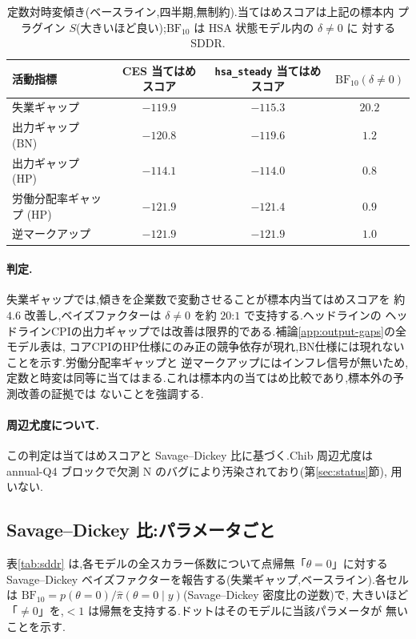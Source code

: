 \documentclass[11pt]{article}
\newcommand{\code}[1]{\texttt{#1}}
\begin{document}
\begin{table}[H]
\centering
\caption{定数対時変傾き(ベースライン,四半期,無制約).当てはめスコアは上記の標本内
プラグイン $S$(大きいほど良い);$\mathrm{BF}_{10}$ は HSA 状態モデル内の $\delta\neq0$ に
対する SDDR.}
\label{tab:mc}
\begin{tabular}{lccc}
\toprule
活動指標 & CES 当てはめスコア & \code{hsa\_steady} 当てはめスコア & $\mathrm{BF}_{10}(\delta\neq0)$ \\
\midrule
失業ギャップ     & $-119.9$ & $\mathbf{-115.3}$ & $\mathbf{20.2}$ \\
出力ギャップ (BN)      & $-120.8$ & $-119.6$ & $1.2$ \\
出力ギャップ (HP)      & $-114.1$ & $-114.0$ & $0.8$ \\
労働分配率ギャップ (HP) & $-121.9$ & $-121.4$ & $0.9$ \\
逆マークアップ       & $-121.9$ & $-121.9$ & $1.0$ \\
\bottomrule
\end{tabular}
\end{table}

\paragraph{判定.} 失業ギャップでは,傾きを企業数で変動させることが標本内当てはめスコアを
約 $4.6$ 改善し,ベイズファクターは $\delta\neq0$ を約 $20$:$1$ で支持する.ヘッドラインの
ヘッドラインCPIの出力ギャップでは改善は限界的である.補論\ref{app:output-gaps}の全モデル表は,
コアCPIのHP仕様にのみ正の競争依存が現れ,BN仕様には現れないことを示す.労働分配率ギャップと
逆マークアップにはインフレ信号が無いため,
定数と時変は同等に当てはまる.これは標本内の当てはめ比較であり,標本外の予測改善の証拠では
ないことを強調する.

\paragraph{周辺尤度について.} この判定は当てはめスコアと Savage--Dickey 比に基づく.Chib
周辺尤度は annual-Q4 ブロックで欠測 N のバグにより汚染されており(第\ref{sec:status}節),
用いない.

\subsection{Savage--Dickey 比:パラメータごと}
表\ref{tab:sddr} は,各モデルの全スカラー係数について点帰無「$\theta=0$」に対する
Savage--Dickey ベイズファクターを報告する(失業ギャップ,ベースライン).各セルは
$\mathrm{BF}_{10}=p(\theta=0)/\hat\pi(\theta=0\mid y)$(Savage--Dickey 密度比の逆数)で,
大きいほど「$\ne 0$」を,$<1$ は帰無を支持する.ドットはそのモデルに当該パラメータが
無いことを示す.
\end{document}
